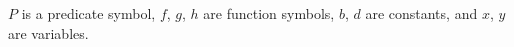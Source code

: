 $P$ is a predicate symbol, $f$, $g$, $h$ are function symbols, $b$, $d$ are constants, and $x$, $y$ are variables.
